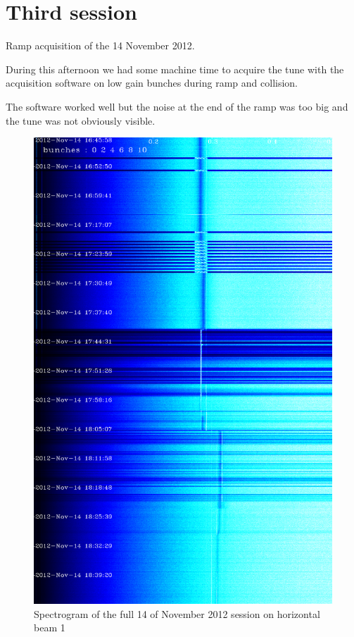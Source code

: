 \section{Third session}

Ramp acquisition of the 14 November 2012. 

During this afternoon we had some machine time to acquire the tune with the acquisition software on low gain bunches during ramp and collision.

The software worked well but the noise at the end of the ramp was too big and the tune was not obviously visible.

\begin{figure}[H]
\centering
\caption{Spectrogram of the full 14 of November 2012 session on horizontal beam 1}
\includegraphics[scale=0.3]{md-121114-hb1-bunches111111-16.png}
\end{figure}


